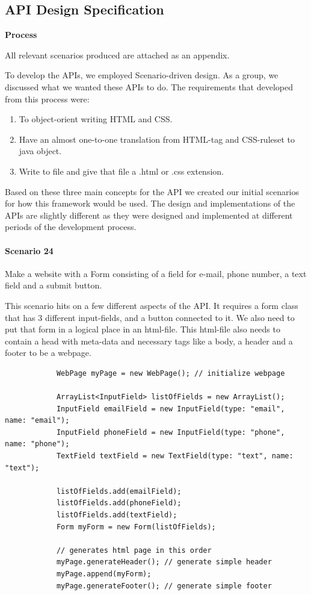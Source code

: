 \documentclass[12pt]{article}
\begin{document}
    \subsection{API Design Specification}


    \textbf{Process}

    All relevant scenarios produced are attached as an appendix.

    To develop the APIs, we employed Scenario-driven design. As a group, we discussed what we wanted these APIs to do. The requirements that developed from this process were:

    \begin{enumerate}
        \item To object-orient writing HTML and CSS.
        \item Have an almost one-to-one translation from HTML-tag and CSS-ruleset to java object.
        \item Write to file and give that file a .html or .css extension. 
    \end{enumerate}
    
    Based on these three main concepts for the API we created our initial scenarios for how this framework would be used. 
    The design and implementations of the APIs are slightly different as they were designed and implemented at different periods of the development process.

    \paragraph{Scenario 24}
    Make a website with a Form consisting of a field for e-mail, phone number, a text field and a submit button.

    This scenario hits on a few different aspects of the API. It requires a form class that has 3 different input-fields, and a button connected to it. We also need to put that form in a logical place in an html-file. This html-file also needs to contain a head with meta-data and necessary tags like a body, a header and a footer to be a webpage.

    \begin{shaded}
        \begin{lstlisting}
            WebPage myPage = new WebPage(); // initialize webpage

            ArrayList<InputField> listOfFields = new ArrayList();
            InputField emailField = new InputField(type: "email", name: "email");
            InputField phoneField = new InputField(type: "phone", name: "phone");
            TextField textField = new TextField(type: "text", name: "text");

            listOfFields.add(emailField);
            listOfFields.add(phoneField);
            listOfFields.add(textField);
            Form myForm = new Form(listOfFields);

            // generates html page in this order
            myPage.generateHeader(); // generate simple header
            myPage.append(myForm);
            myPage.generateFooter(); // generate simple footer
        \end{lstlisting}
    \end{shaded}
\end{document}
